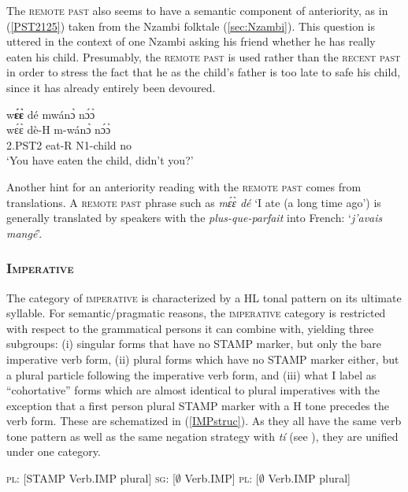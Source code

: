 The \textsc{remote past} also seems to have a semantic component of anteriority, as in (\ref{PST2125}) taken from the Nzambi folktale (\ref{sec:Nzambi}).
This question is uttered in the context of one Nzambi asking his friend whether he has really eaten his child. Presumably, the \textsc{remote past} is used rather than the \textsc{recent past} in order to stress the fact that he as the child's father is too late to safe his child, since it has already entirely been devoured.

\begin{exe} 
\ex\label{PST2125}
  \glll w{\bfseries ɛ́ɛ̀} dé mwánɔ̀ nɔ́ɔ̀ \\
       wɛ́ɛ̀ dè-H m-wánɔ̀ nɔ́ɔ̀ \\
      2.PST2 eat-R N1-child no \\
    \trans `You have eaten the child, didn't you?'
\end{exe}

\noindent Another hint for an anteriority reading with the \textsc{remote past} comes from translations. A \textsc{remote past} phrase such as {\itshape mɛ́ɛ̀ dé} `I ate (a long time ago') is generally translated by speakers with the {\itshape plus-que-parfait} into French: `{\itshape j'avais mangé}'.






\subsubsection{\textsc{Imperative}}
\label{sec:imp}


The category of  \textsc{imperative} is characterized by a HL tonal pattern on its ultimate syllable.
For semantic/pragmatic reasons, the \textsc{imperative} category is restricted with respect to the grammatical persons it can combine with, yielding three subgroups: (i) singular forms that have no STAMP marker, but only the bare imperative verb form, (ii) plural forms which have no STAMP marker either, but a plural particle following the imperative verb form, and (iii) what I label as ``cohortative''  forms which are almost identical to plural imperatives with the exception that a  first person plural STAMP marker with a H tone precedes the verb form. These are schematized  in (\ref{IMPstruc}). As they all have the same verb tone pattern as well as the same negation strategy with {\itshape tí} (see ), they are unified under one category. 

\begin{exe}
\ex\label{IMPstruc}
\begin{xlist}
\textsc{pl}: [STAMP  Verb.IMP plural]
\textsc{sg}: [$\emptyset$  Verb.IMP]
\textsc{pl}: [$\emptyset$  Verb.IMP plural]
\end{xlist}
\end{exe}

